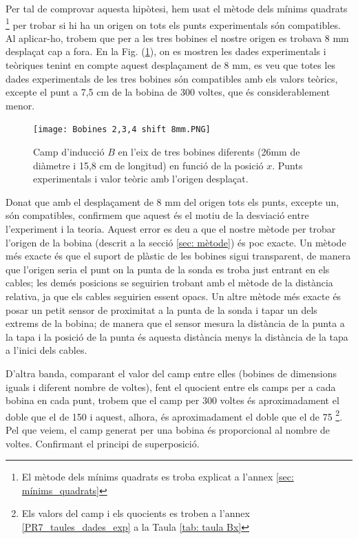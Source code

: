 \documentclass[11pt]{article}
\numberwithin{equation}{section}
\numberwithin{figure}{section}
\numberwithin{table}{section}
\begin{document}
Per tal de comprovar aquesta hipòtesi, hem usat el mètode dels mínims quadrats \footnote{El mètode dels mínims quadrats es troba explicat a l'annex \ref{sec: mínims_quadrats}} per trobar si hi ha un origen on tots els punts experimentals són compatibles. Al aplicar-ho, trobem que per a les tres bobines el nostre origen es trobava 8 mm desplaçat cap a fora. En la Fig. (\ref{fig: Bvsx_26mm}), on es mostren les dades experimentals i teòriques tenint en compte aquest desplaçament de 8 mm, es veu que totes les dades experimentals de les tres bobines són compatibles amb els valors teòrics, excepte el punt a 7,5 cm de la bobina de 300 voltes, que és considerablement menor.

\begin{figure}[H]
    \centering
    \texttt{[image: Bobines 2,3,4 shift 8mm.PNG]}
    \caption{Camp d'inducció $B$ en l'eix de tres bobines diferents (26mm de diàmetre i 15,8 cm de longitud) en funció de la posició $x$. Punts experimentals i valor teòric amb l'origen desplaçat.}
    \label{fig: Bvsx_26mm}
\end{figure}

Donat que amb el desplaçament de 8 mm del origen tots els punts, excepte un, són compatibles, confirmem que aquest és el motiu de la desviació entre l'experiment i la teoria. Aquest error es deu a que el nostre mètode per trobar l'origen de la bobina (descrit a la secció \ref{sec: mètode}) és poc exacte. Un mètode més exacte és que el suport de plàstic de les bobines sigui transparent, de manera que l'origen seria el punt on la punta de la sonda es troba just entrant en els cables; les demés posicions se seguirien trobant amb el mètode de la distància relativa, ja que els cables seguirien essent opacs. Un altre mètode més exacte és posar un petit sensor de proximitat a la punta de la sonda i tapar un dels extrems de la bobina; de manera que el sensor mesura la distància de la punta a la tapa i la posició de la punta és aquesta distància menys la distància de la tapa a l'inici dels cables.

D'altra banda, comparant el valor del camp entre elles (bobines de dimensions iguals i diferent nombre de voltes), fent el quocient entre els camps per a cada bobina en cada punt, trobem que el camp per 300 voltes és aproximadament el doble que el de 150 i aquest, alhora, és aproximadament el doble que el de 75 \footnote{Els valors del camp i els quocients es troben a l'annex \ref{PR7_taules_dades_exp} a la Taula \ref{tab: taula Bx}}. Pel que veiem, el camp generat per una bobina és proporcional al nombre de voltes. Confirmant el principi de superposició.
\end{document}
